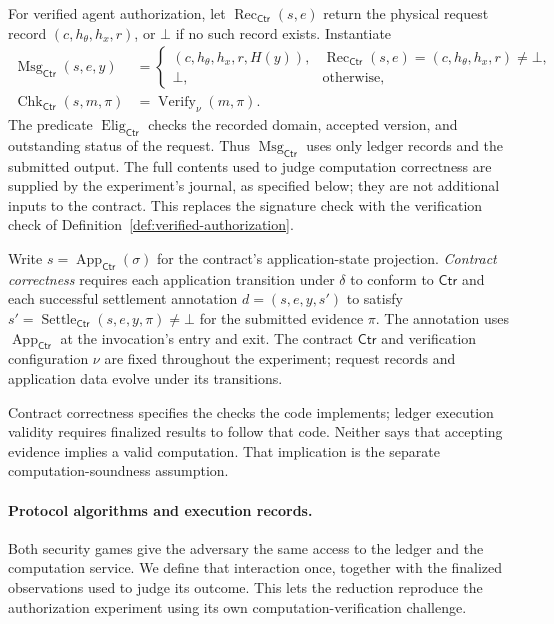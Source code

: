 \documentclass[10pt,letterpaper]{article}
\newcommand{\Verify}{\operatorname{Verify}}
\newcommand{\Msg}{\operatorname{Msg}}
\newcommand{\Ctr}{\mathsf{Ctr}}
\begin{document}
For verified agent authorization, let $\operatorname{Rec}_{\Ctr}(s,e)$ return the physical request record $(c,h_\theta,h_x,r)$, or $\bot$ if no such record exists. Instantiate
\begin{align*}
 \Msg_{\Ctr}(s,e,y)&=
 \begin{cases}
 (c,h_\theta,h_x,r,H(y)),&\operatorname{Rec}_{\Ctr}(s,e)=(c,h_\theta,h_x,r)\ne\bot,\\
 \bot,&\text{otherwise},
 \end{cases}\\
 \operatorname{Chk}_{\Ctr}(s,m,\pi)&=\Verify_\nu(m,\pi).
\end{align*}
The predicate $\operatorname{Elig}_{\Ctr}$ checks the recorded domain, accepted version, and outstanding status of the request. Thus $\Msg_{\Ctr}$ uses only ledger records and the submitted output. The full contents used to judge computation correctness are supplied by the experiment's journal, as specified below; they are not additional inputs to the contract. This replaces the signature check with the verification check of Definition~\ref{def:verified-authorization}.

Write $s=\operatorname{App}_{\Ctr}(\sigma)$ for the contract's application-state projection. \emph{Contract correctness} requires each application transition under $\delta$ to conform to $\Ctr$ and each successful settlement annotation $d=(s,e,y,s')$ to satisfy $s'=\operatorname{Settle}_{\Ctr}(s,e,y,\pi)\ne\bot$ for the submitted evidence $\pi$. The annotation uses $\operatorname{App}_{\Ctr}$ at the invocation's entry and exit. The contract $\Ctr$ and verification configuration $\nu$ are fixed throughout the experiment; request records and application data evolve under its transitions.

Contract correctness specifies the checks the code implements; ledger execution validity requires finalized results to follow that code. Neither says that accepting evidence implies a valid computation. That implication is the separate computation-soundness assumption.

\paragraph{Protocol algorithms and execution records.}
Both security games give the adversary the same access to the ledger and the computation service. We define that interaction once, together with the finalized observations used to judge its outcome. This lets the reduction reproduce the authorization experiment using its own computation-verification challenge.
\end{document}
